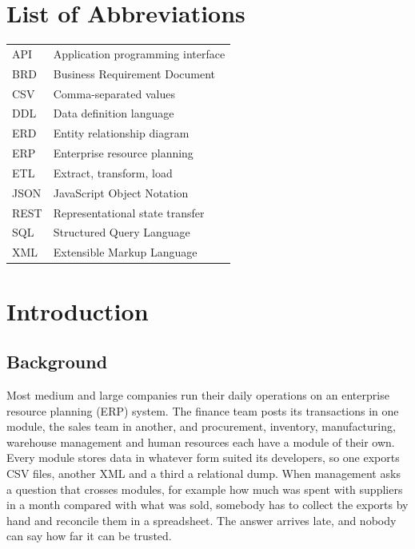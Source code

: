 \documentclass[12pt,a4paper]{report}
\begin{document}
\chapter*{List of Abbreviations}
\begin{tabular}{@{}p{2.6cm}p{11cm}@{}}
API & Application programming interface\\
BRD & Business Requirement Document\\
CSV & Comma-separated values\\
DDL & Data definition language\\
ERD & Entity relationship diagram\\
ERP & Enterprise resource planning\\
ETL & Extract, transform, load\\
JSON & JavaScript Object Notation\\
REST & Representational state transfer\\
SQL & Structured Query Language\\
XML & Extensible Markup Language\\
\end{tabular}

\clearpage
{}
\setcounter{page}{1}

\chapter{Introduction}

\section{Background}
Most medium and large companies run their daily operations on an enterprise resource planning (ERP) system. The finance team posts its transactions in one module, the sales team in another, and procurement, inventory, manufacturing, warehouse management and human resources each have a module of their own. Every module stores data in whatever form suited its developers, so one exports CSV files, another XML and a third a relational dump. When management asks a question that crosses modules, for example how much was spent with suppliers in a month compared with what was sold, somebody has to collect the exports by hand and reconcile them in a spreadsheet. The answer arrives late, and nobody can say how far it can be trusted.
\end{document}
